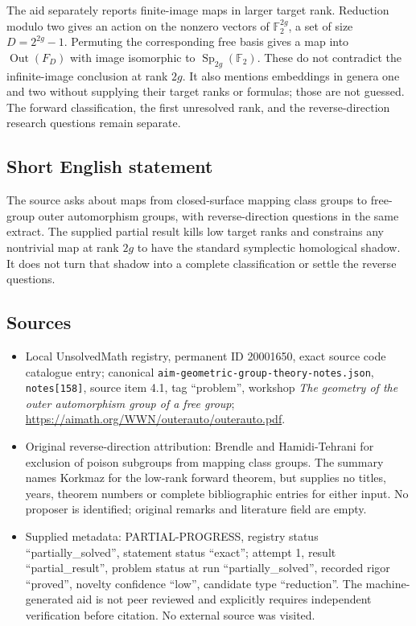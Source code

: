 \documentclass[11pt]{article}
\newcommand{\F}{\mathbb{F}}
\begin{document}
The aid separately reports finite-image maps in larger target rank. Reduction modulo two gives an action on the nonzero vectors of $\F_2^{2g}$, a set of size $D=2^{2g}-1$. Permuting the corresponding free basis gives a map into $\operatorname{Out}(F_D)$ with image isomorphic to $\operatorname{Sp}_{2g}(\F_2)$. These do not contradict the infinite-image conclusion at rank $2g$. It also mentions embeddings in genera one and two without supplying their target ranks or formulas; those are not guessed. The forward classification, the first unresolved rank, and the reverse-direction research questions remain separate.
\subsection{Short English statement}
The source asks about maps from closed-surface mapping class groups to free-group outer automorphism groups, with reverse-direction questions in the same extract. The supplied partial result kills low target ranks and constrains any nontrivial map at rank $2g$ to have the standard symplectic homological shadow. It does not turn that shadow into a complete classification or settle the reverse questions.
\subsection{Sources}
\begin{itemize}
\item Local UnsolvedMath registry, permanent ID 20001650, exact source code catalogue entry; canonical \texttt{aim-geometric-group-theory-notes.json}, \texttt{notes[158]}, source item 4.1, tag ``problem'', workshop \emph{The geometry of the outer automorphism group of a free group}; \url{https://aimath.org/WWN/outerauto/outerauto.pdf}.
\item Original reverse-direction attribution: Brendle and Hamidi-Tehrani for exclusion of poison subgroups from mapping class groups. The summary names Korkmaz for the low-rank forward theorem, but supplies no titles, years, theorem numbers or complete bibliographic entries for either input. No proposer is identified; original remarks and literature field are empty.
\item Supplied metadata: PARTIAL-PROGRESS, registry status ``partially\_solved'', statement status ``exact''; attempt 1, result ``partial\_result'', problem status at run ``partially\_solved'', recorded rigor ``proved'', novelty confidence ``low'', candidate type ``reduction''. The machine-generated aid is not peer reviewed and explicitly requires independent verification before citation. No external source was visited.
\end{itemize}
\end{document}
